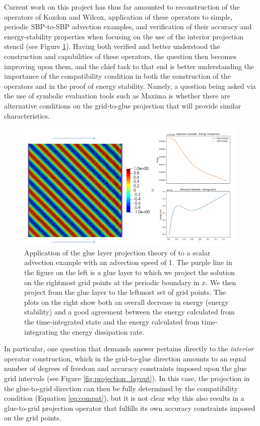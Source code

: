 Current work on this project has thus far amounted to reconstruction of the
operators of Kozdon and Wilcox, application of these operators to simple, periodic
SBP-to-SBP advection examples, and verification of their accuracy and energy-stability
properties when focusing on the use of the interior projection stencil (see Figure \ref{fig:advection_projection}).
Having both verified and better understood the construction and capabilities of these operators,
the question then becomes improving upon them, and the chief task to that end is
better understanding the importance of the compatibility condition in both the
construction of the operators and in the proof of energy stability. Namely,
a question being asked via the use of symbolic evaluation tools such as Maxima \cite{li2008maxima}
is whether there are alternative conditions on the grid-to-glue projection that
will provide similar characteristics.
\begin{figure}
\centering
\includegraphics[width=0.9\linewidth,trim=4 4 4 4,clip]{figures/advection_projection.png}
\caption{Application of the glue layer projection theory of \cite{kozdon2016stable} to a
	 scalar advection example with an advection speed of 1. The purple line in the figure
	 on the left is a glue layer to which we project the solution on the rightmost grid points
	 at the periodic boundary in $x$. We then project from the glue layer to the leftmost set
	 of grid points. The plots on the right show both an overall decrease in energy (energy stability)
	 and a good agreement between the energy calculated from the time-integrated state and the energy
	 calculated from time-integrating the energy dissipation rate.}
\label{fig:advection_projection}
\end{figure}
In particular, one question that demands answer pertains directly to the
\emph{interior} operator construction, which in the grid-to-glue direction
amounts to an equal number of degrees of freedom and accuracy constraints
imposed upon the glue grid intervals (see Figure \ref{fig:projection_layout}). In
this case, the projection in the glue-to-grid direction can then be fully
determined by the compatibility condition (Equation \ref{eq:compat}), but
it is not clear why this also results in a glue-to-grid projection operator
that fulfills its own accuracy constraints imposed on the grid points.

